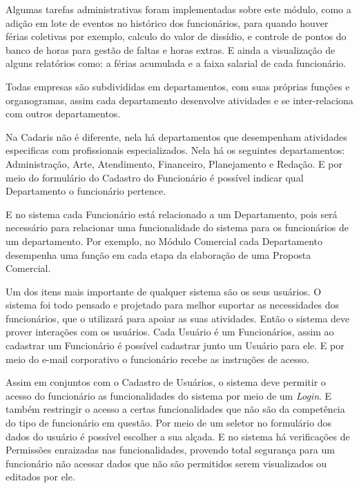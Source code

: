 \documentclass[
  12pt,				%
  openany,
  oneside,
  a4paper,			%
  english,			%
  brazil
]{article}
\numberwithin{figure}{section}
\numberwithin{table}{section}
\newcounter{subsubsubsection}[subsubsection]
\begin{document}
Algumas tarefas administrativas foram implementadas sobre este módulo, como a adição em lote de eventos no histórico dos funcionários, para quando houver férias coletivas por exemplo, calculo do valor de dissídio, e controle de pontos do banco de horas para gestão de faltas e horas extras. E ainda a visualização de alguns relatórios como: a férias acumulada e a faixa salarial de cada funcionário.



Todas empresas são subdivididas em departamentos, com suas próprias funções e organogramas, assim cada departamento desenvolve atividades e se inter-relaciona com outros departamentos.

Na Cadaris não é diferente, nela há departamentos que desempenham atividades especificas com profissionais especializados. Nela há os seguintes departamentos: Administração, Arte, Atendimento, Financeiro, Planejamento e Redação. E por meio do formulário do Cadastro do Funcionário é possível indicar qual Departamento o funcionário pertence.

E no sistema cada Funcionário está relacionado a um Departamento, pois será necessário para relacionar uma funcionalidade  do sistema para os funcionários de um departamento. Por exemplo, no Módulo Comercial cada Departamento desempenha uma função em cada etapa da elaboração de uma Proposta Comercial.



Um dos itens mais importante de qualquer sistema são os seus usuários. O sistema foi todo pensado e projetado para melhor suportar as necessidades dos funcionários, que o utilizará para apoiar as suas atividades. Então o sistema deve prover interações com os usuários. Cada Usuário é um Funcionários, assim ao cadastrar um Funcionário é possível cadastrar junto um Usuário para ele. E por meio do e-mail corporativo o funcionário recebe as instruções de acesso.

Assim em conjuntos com o Cadastro de Usuários, o sistema deve permitir o acesso do funcionário as funcionalidades do sistema por meio de um \textit{Login}. E também restringir o acesso a certas funcionalidades que não são da competência do tipo de funcionário em questão. Por meio de um seletor no formulário dos dados do usuário é possível escolher a sua alçada. E no sistema há verificações de Permissões enraizadas nas funcionalidades, provendo total segurança para um funcionário não acessar dados que não são permitidos serem visualizados ou editados por ele.
\end{document}
